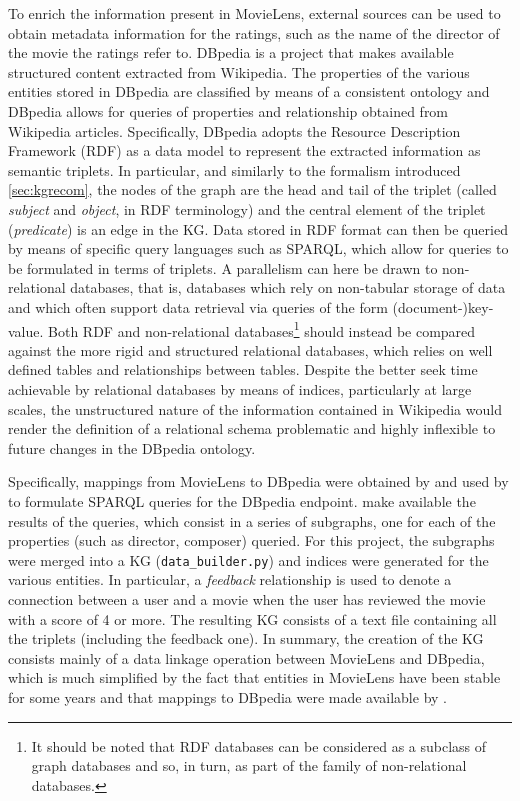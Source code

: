 To enrich the information present in MovieLens, external sources can be used to obtain metadata information for the ratings, such as the name of the director of the movie the ratings refer to.
DBpedia \parencite{auer2007dbpedia} is a project that makes available structured  content extracted from Wikipedia.
The properties of the various entities stored in DBpedia are classified by means of a consistent ontology and DBpedia allows for queries of properties and relationship obtained from Wikipedia articles.
Specifically, DBpedia adopts the Resource Description Framework (RDF) as a data model to represent the extracted information as semantic triplets.
In particular, and similarly to the formalism introduced \cref{sec:kgrecom}, the nodes of the graph are the head and tail of the triplet (called \emph{subject} and \emph{object}, in RDF terminology) and the central element of the triplet (\emph{predicate}) is an edge in the KG.
Data stored in RDF format can then be queried by means of specific query languages such as SPARQL, which allow for queries to be formulated in terms of triplets.
A parallelism can here be drawn to non-relational databases, that is, databases which rely on non-tabular storage of data and which often support data retrieval via queries of the form (document-)key-value.
Both RDF and non-relational databases\footnote{It should be noted that RDF databases can be considered as a subclass of graph databases and so, in turn, as part of the family of non-relational databases.} should instead be compared against the more rigid and structured relational databases, which relies on well defined tables and relationships between tables.
Despite the better seek time achievable by relational databases by means of indices, particularly at large scales, the unstructured nature of the information contained in Wikipedia would render the definition of a relational schema problematic and highly inflexible to future changes in the DBpedia ontology. 

Specifically, mappings  from MovieLens to DBpedia were obtained by \cite{ostuni2013top} and used by \cite{palumbo2017entity2rec} to formulate SPARQL queries for the DBpedia endpoint.
\cite{palumbo2017entity2rec} make available the results of the queries, which consist in a series of subgraphs, one for each of the properties (such as director, composer) queried.
For this project, the subgraphs were merged into a KG (\texttt{data\_builder.py}) and indices were generated for the various entities.
In particular, a \emph{feedback} relationship is used to denote a connection between a user and a movie when the user has reviewed the movie with a score of \num{4} or more.
The resulting KG consists of a text file containing all the triplets (including the feedback one).
In summary, the creation of the KG consists mainly of a data linkage operation between MovieLens and DBpedia, which is much simplified by the fact that entities in MovieLens have been stable for some years and that mappings to DBpedia were made available by \cite{ostuni2013top}.




